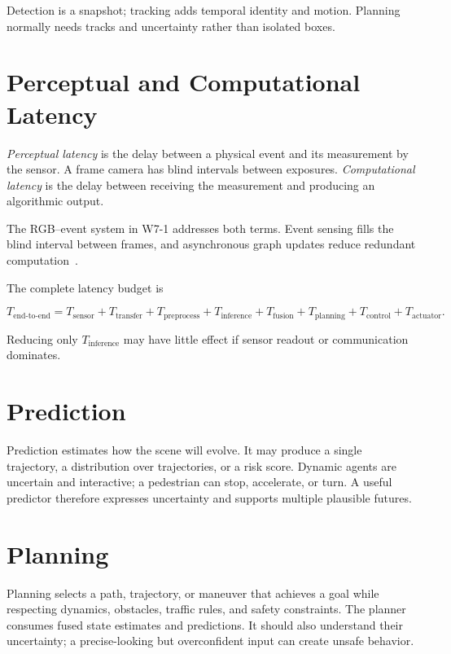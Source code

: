 Detection is a snapshot; tracking adds temporal identity and motion. Planning normally needs tracks and uncertainty rather than isolated boxes.

\section{Perceptual and Computational Latency}

\emph{Perceptual latency} is the delay between a physical event and its measurement by the sensor. A frame camera has blind intervals between exposures. \emph{Computational latency} is the delay between receiving the measurement and producing an algorithmic output.

The RGB--event system in W7-1 addresses both terms. Event sensing fills the blind interval between frames, and asynchronous graph updates reduce redundant computation~\cite{gehrig2024lowlatency}.

The complete latency budget is

\[
T_{\text{end-to-end}} =
T_{\text{sensor}} +
T_{\text{transfer}} +
T_{\text{preprocess}} +
T_{\text{inference}} +
T_{\text{fusion}} +
T_{\text{planning}} +
T_{\text{control}} +
T_{\text{actuator}}.
\]

Reducing only \(T_{\text{inference}}\) may have little effect if sensor readout or communication dominates.

\section{Prediction}

Prediction estimates how the scene will evolve. It may produce a single trajectory, a distribution over trajectories, or a risk score. Dynamic agents are uncertain and interactive; a pedestrian can stop, accelerate, or turn. A useful predictor therefore expresses uncertainty and supports multiple plausible futures.

\section{Planning}

Planning selects a path, trajectory, or maneuver that achieves a goal while respecting dynamics, obstacles, traffic rules, and safety constraints. The planner consumes fused state estimates and predictions. It should also understand their uncertainty; a precise-looking but overconfident input can create unsafe behavior.

